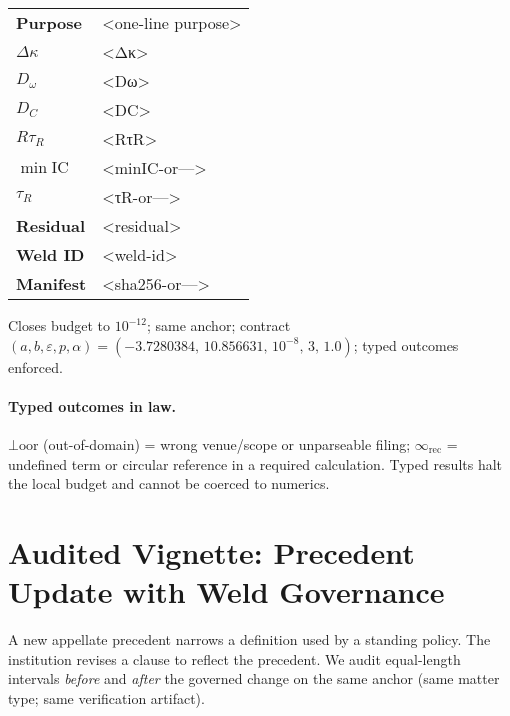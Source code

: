 \begin{eqbox}
\small
\begin{tabularx}{\linewidth}{@{}>{\bfseries}l >{\ttfamily}X@{}}
Purpose           & <one-line purpose> \\
$\Delta\kappa$    & <Δκ> \\
$D_{\omega}$      & <Dω> \\
$D_{C}$           & <DC> \\
$R\tau_{R}$       & <RτR> \\
$\min\mathrm{IC}$ & <minIC-or—> \\
$\tau_{R}$        & <τR-or—> \\
Residual          & <residual> \\
Weld ID           & <weld-id> \\
Manifest          & <sha256-or—> \\
\end{tabularx}

\vspace{0.2\baselineskip}
\raggedright\footnotesize
Closes budget to $10^{-12}$; same anchor; contract $(a,b,\varepsilon,p,\alpha)=(-3.7280384,\,10.856631,\,10^{-8},\,3,\,1.0)$; typed outcomes enforced.
\end{eqbox}


\paragraph{Typed outcomes in law.}
\(\bot\!\mathrm{oor}\) (out-of-domain) = wrong venue/scope or unparseable filing;\;
\(\infty_{\mathrm{rec}}\) = undefined term or circular reference in a required calculation.
Typed results halt the local budget and cannot be coerced to numerics.

\section{Audited Vignette: Precedent Update with Weld Governance}
\label{sec:legal-vignette}

A new appellate precedent narrows a definition used by a standing policy. The institution revises a clause to reflect the precedent. We audit equal-length intervals \emph{before} and \emph{after} the governed change on the same anchor (same matter type; same verification artifact).

